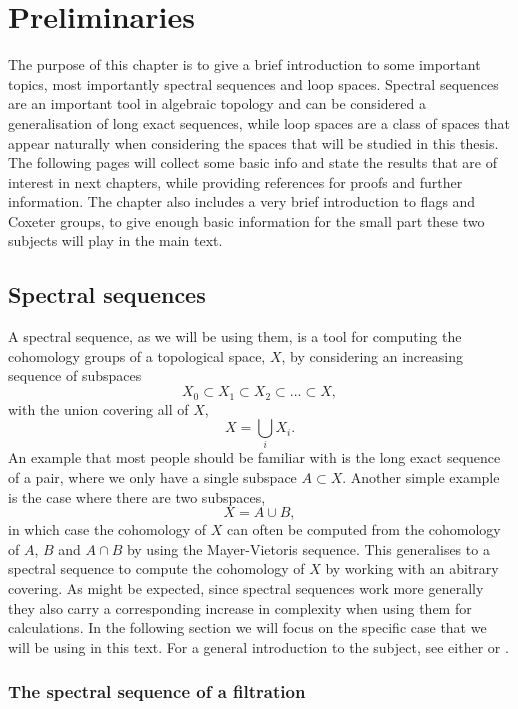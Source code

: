 
\chapter{Preliminaries}
\label{chap:generelt}

The purpose of this chapter is to give a brief introduction to some
important topics, most importantly spectral sequences
and loop spaces. Spectral sequences are an important tool in algebraic
topology 
and can be considered a generalisation of long exact sequences, while
loop spaces are a class of spaces that appear naturally when
considering the spaces that will be studied in this thesis. The
following pages will collect some basic info and state the results
that are of interest in next chapters, while providing references for
proofs and further information. The chapter also includes a very brief
introduction to flags and Coxeter groups, to give enough basic
information for the small part these two subjects will play in the
main text.

\section{Spectral sequences}
\label{sec:ss}

A spectral sequence, as we will be using them, is a tool for computing
the cohomology groups of a topological space, $X$, by considering an
increasing sequence of subspaces
\[ X_0 \subset X_1 \subset X_2 \subset \dots \subset X, \]
with the union covering all of $X$,
\[ X = \bigcup_{i} X_i. \]
An example that most people should be familiar with is the long exact
sequence of a pair, where
we only have a single subspace $A \subset X$. Another simple example
is the case where there are two subspaces,
\[ X = A \cup B, \]
in which case the cohomology of $X$ can often be computed from the
cohomology of $A$, $B$ and $A\cap B$ by using the Mayer-Vietoris
sequence. This generalises to a spectral sequence to compute
the cohomology of $X$ by working with an abitrary covering. As might
be expected, since spectral sequences work more generally they also
carry a corresponding increase in complexity when using them for
calculations. In the following section we will focus on the specific
case that 
we will be using in this text. For a general introduction to the
subject, see either \cite{hatcherss} or \cite{mccleary}.

\subsection{The spectral sequence of a filtration}
\label{sec:ss-filtration}

